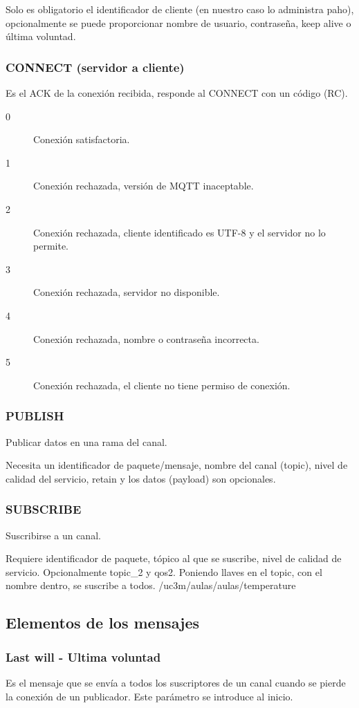 \documentclass[12pt, twoside, openright]{report} %
\begin{document}
Solo es obligatorio el identificador de cliente (en nuestro caso lo administra paho), opcionalmente se puede proporcionar nombre de usuario, contraseña, keep alive o última voluntad.

\subsubsection{CONNECT (servidor a cliente)}
Es el ACK de la conexión recibida, responde al CONNECT con un código (RC).
\begin{description}
	\item[0] Conexión satisfactoria.
	\item[1] Conexión rechazada, versión de MQTT inaceptable.
	\item[2] Conexión rechazada, cliente identificado es UTF-8 y el servidor no lo permite.
	\item[3] Conexión rechazada, servidor no disponible.
	\item[4] Conexión rechazada, nombre o contraseña incorrecta.
	\item[5] Conexión rechazada, el cliente no tiene permiso de conexión.
\end{description}

\subsubsection{PUBLISH}
Publicar datos en una rama del canal.

Necesita un identificador de paquete/mensaje, nombre del canal (topic), nivel de calidad del servicio, retain y los datos (payload) son opcionales.

\subsubsection{SUBSCRIBE}
Suscribirse a un canal.

Requiere identificador de paquete, tópico al que se suscribe, nivel de calidad de servicio. Opcionalmente topic\_2 y qos2. Poniendo llaves en el topic, con el nombre dentro, se suscribe a todos. /uc3m/aulas/{aulas}/temperature

\subsection{Elementos de los mensajes}

\subsubsection{Last will - Ultima voluntad}
Es el mensaje que se envía a todos los suscriptores de un canal cuando se pierde la conexión de un publicador. Este parámetro se introduce al inicio.
\end{document}
